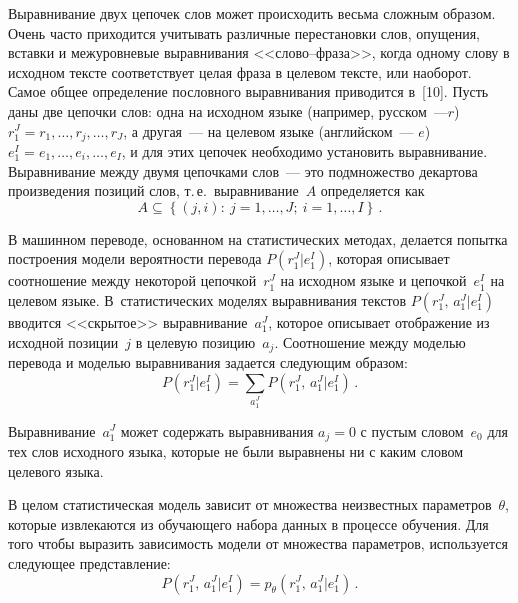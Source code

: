 \begin{multicols}{2}
      Выравнивание двух цепочек слов может происходить весьма сложным 
образом. Очень часто приходится учитывать различные перестановки слов, 
опущения, вставки и межуровневые выравнивания <<слово--фраза>>, когда 
одному слову в исходном тексте соответствует целая фраза в целевом тексте, 
или наоборот. Самое общее определение пословного выравнивания 
приводится в~[10]. Пусть даны две цепочки слов: одна на исходном языке 
(например, русском~---$r$) $r_1^J =r_1, \ldots , r_j,\ldots , r_J$, а другая~--- на 
целевом языке (английском~--- $e$) $e_1^I=e_1,\ldots , e_i,\ldots ,e_I$, и для 
этих цепочек необходимо установить выравнивание. Выравнивание между 
двумя цепочками слов~--- это подмножество декартова произведения 
позиций слов, т.\,е.\ выравнивание~$A$ определяется как
      \begin{equation*}
      A\subseteq \left \{\left(j,i\right):\ j=1,\ldots ,J;\ i=1,\ldots ,I\right \}\,.
      \end{equation*}
      
      В машинном переводе, основанном на статистических методах, 
делается попытка построения модели вероятности перевода $P(r_1^J\vert 
e_1^I)$, которая описывает соотношение между некоторой цепочкой~$r_1^J$ 
на исходном языке и цепочкой~$e_1^I$ на целевом языке. В~статистических 
моделях выравнивания текстов $P(r_1^J,\,a_1^J\vert e_1^I)$ вводится 
<<скрытое>> выравнивание~$a_1^J$, которое описывает отображение из 
исходной позиции~$j$ в целевую позицию~$a_j$. Соотношение между 
моделью перевода и моделью выравнивания задается следующим образом:
      \begin{equation*}
      P\left(r_1^J\vert e_1^I\right)=\sum\limits_{a_1^J} P\left( 
r_1^J,\,a_1^J\vert e_1^I\right)\,.
      \end{equation*}
      
      Выравнивание~$a_1^J$ может содержать выравнивания $a_j=0$ с 
пустым словом~$e_0$ для тех слов исходного языка, которые не были 
выравнены ни с каким словом целевого языка.
      
      В целом статистическая модель зависит от множества неизвестных 
параметров~$\theta$, которые извлекаются из обучающего набора данных в 
процессе обучения. Для того чтобы выразить зависимость модели от 
множества параметров, используется следующее представление:
      \begin{equation*}
      P\left( r_1^J,\,a_1^J\vert e_1^I\right) =p_\theta\left( r_1^J,\,a_1^J\vert 
e_1^I\right)\,.
      \end{equation*}
      

\end{multicols}

